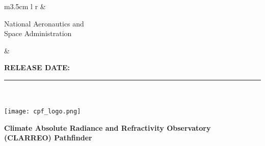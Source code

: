 \begin{table}[h!]
  \centering
  \begin{tabular}{ m{3.5cm} l r }
    &
    \begin{minipage}{5cm}
      \raggedright
      \vspace{-0.8in}
      \textsf{\noindent
        \footnotesize{National Aeronautics and\\
        \vspace{-5pt}Space Administration}
        }
    \end{minipage}
    &
    \begin{minipage}[t]{7.5cm}
    \vspace{-0.6in}
    \raggedleft\bfseries
    RELEASE DATE:~\MakeTextUppercase\releasedate
    \end{minipage}
  \end{tabular}
\end{table}

\vspace{-0.7in}
\rule{\linewidth}{2.25pt}
~\\
~\\
\vspace{0.42in}
\centering
\texttt{[image: cpf\_logo.png]}

\Large\bfseries
	Climate Absolute Radiance and Refractivity Observatory \\
	(CLARREO) Pathfinder \\
\vspace{0.4in}

\mytitle

\normalsize
\vspace{0.25in}
\mydate \\
\normalfont
\vspace{0.05in}
\clearpage
% 

